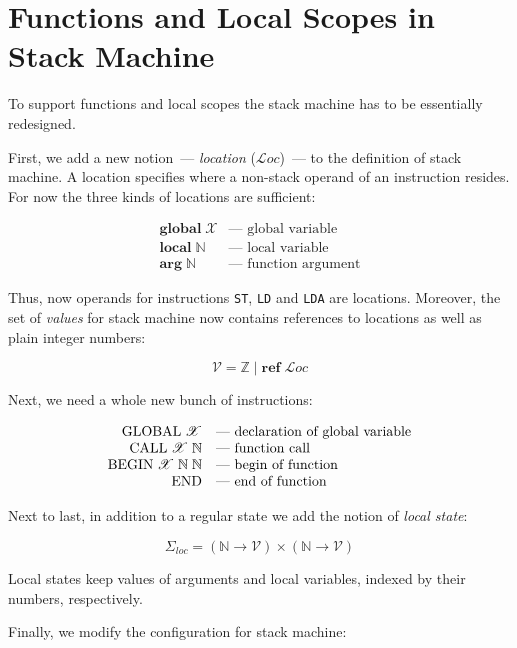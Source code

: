 \documentclass{article}
\author{Dmitry Boulytchev}
\newcommand{\llang}[1]{\mbox{\lstinline[mathescape]|#1|}}
\newcommand{\primi}[2]{\mathbf{#1}\;{#2}}
\theoremstyle{definition}
\begin{document}
\section{Functions and Local Scopes in Stack Machine}

To support functions and local scopes the stack machine has to be essentially redesigned.

First, we add a new notion~--- \emph{location} ($\mathcal Loc$)~--- to the definition of stack machine. A location specifies where a non-stack operand of an instruction
resides. For now the three kinds of locations are sufficient:

\[
\begin{array}{rl}
  \primi{global}{\mathscr X} & \mbox{--- global variable}\\
  \primi{local}{\mathbb N}   & \mbox{--- local variable}\\
  \primi{arg}{\mathbb N}     & \mbox{--- function argument}
\end{array}
\]

Thus, now operands for instructions \llang{ST}, \llang{LD} and \llang{LDA} are locations. Moreover, the set of \emph{values} for stack machine now contains
references to locations as well as plain integer numbers:

\[
\mathscr V = \mathbb Z \mid \primi{ref}{\mathcal Loc}
\]

Next, we need a whole new bunch of instructions:

\[
\begin{array}{rl}
  \llang{GLOBAL $\;\mathscr X$}                      & \mbox{--- declaration of global variable}\\
  \llang{CALL $\;\mathscr X\;\mathbb N$}             & \mbox{--- function call}\\
  \llang{BEGIN $\;\mathscr X\;\mathbb N\;\mathbb N$} & \mbox{--- begin of function}\\
  \llang{END}                                        & \mbox{--- end of function}
\end{array}
\]

Next to last, in addition to a regular state we add the notion of \emph{local state}:

\[
\Sigma_{loc} = (\mathbb N \to \mathscr V) \times (\mathbb N \to \mathscr V)
\]

Local states keep values of arguments and local variables, indexed by their numbers, respectively.

Finally, we modify the configuration for stack machine:
\end{document}
